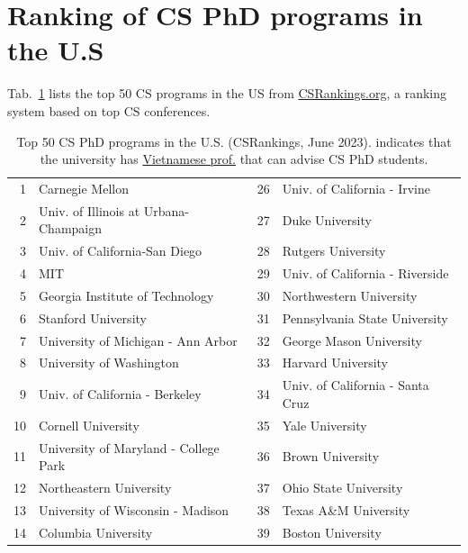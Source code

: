 \documentclass[11pt]{article}
\newcommand{\mycomment}[3][\color{blue}]{{#1{{#2}: {#3}}}}
\newcommand{\tvn}[1]{\mycomment{TVN}{#1}}{}
\newcommand{\red}[1]{{\color{red}{#1}}}
\begin{document}


\section{Ranking of CS PhD programs in the U.S}\label{sec:ranking}
  Tab.~\ref{tab:ranking} lists the top 50 CS programs in the US from \href{https://www.csrankings.org}{CSRankings.org}, a ranking system  based on top CS conferences.
  
  \begin{table}
    \centering
    \small
    \caption{Top 50 CS PhD programs in the U.S. (CSRankings, June 2023). \red{$^*$} indicates that the university has \href{https://github.com/dynaroars/dynaroars.github.io/wiki/Viet-CS-Profs-US}{Vietnamese prof.} that can advise CS PhD students.}\label{tab:ranking}
  \begin{tabular}{rl|rl}
    \toprule
    1 & Carnegie Mellon & 26 & Univ. of California - Irvine \\
    2 & Univ. of Illinois at Urbana-Champaign\red{$^*$}  & 27 &  Duke University \\
    3 & Univ. of California-San Diego & 28 & Rutgers University\red{$^*$} \\
    4 & MIT & 29 & Univ. of California - Riverside\\
    5 & Georgia Institute of Technology         & 30 & Northwestern University\\
    6 & Stanford University& 31 & Pennsylvania State University  \\
    7 & University of Michigan - Ann Arbor\red{$^*$}   & 32& George Mason University\red{$^*$}\\  
    8 & University of Washington      &33 &  Harvard University \\
    9 &  Univ. of California - Berkeley  &34&  Univ. of California - Santa Cruz \\
    10 & Cornell University  & 35 &  Yale University \\
    11 & University of Maryland - College Park &  36& Brown University \\ 
    12 & Northeastern University\red{$^*$} &37&  Ohio State University\\
    13 & University of Wisconsin - Madison\red{$^*$}  &38& Texas A\&M University\red{$^*$} \\
    14 & Columbia University   &39 & Boston University  \\

\end{tabular}
\end{table}
\end{document}
